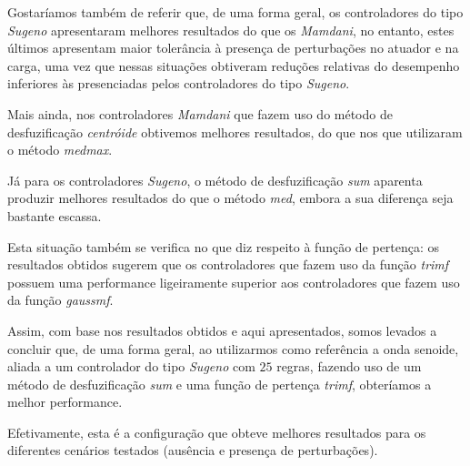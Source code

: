 \documentclass{article}
\begin{document}
Gostaríamos também de referir que, de uma forma geral, os controladores do tipo \emph{Sugeno} apresentaram melhores resultados do que os \emph{Mamdani}, no entanto, estes últimos apresentam maior tolerância à presença de perturbações no atuador e na carga, uma vez que nessas situações obtiveram reduções relativas do desempenho inferiores às presenciadas pelos controladores do tipo \emph{Sugeno}.

Mais ainda, nos controladores \emph{Mamdani} que fazem uso do método de desfuzificação \emph{centróide} obtivemos melhores resultados, do que nos que utilizaram o método \emph{medmax}.

Já para os controladores \emph{Sugeno}, o método de desfuzificação \emph{sum} aparenta produzir melhores resultados do que o método \emph{med}, embora a sua diferença seja bastante escassa.

Esta situação também se verifica no que diz respeito à função de pertença: os resultados obtidos sugerem que os controladores que fazem uso da função \emph{trimf} possuem uma performance ligeiramente superior aos controladores que fazem uso da função \emph{gaussmf}.

Assim, com base nos resultados obtidos e aqui apresentados, somos levados a concluir que, de uma forma geral, ao utilizarmos como referência a onda senoide, aliada a um controlador do tipo \emph{Sugeno} com $25$ regras, fazendo uso de um método de desfuzificação \emph{sum} e uma função de pertença \emph{trimf}, obteríamos a melhor performance.

Efetivamente, esta é a configuração que obteve melhores resultados para os diferentes cenários testados (ausência e presença de perturbações).
\end{document}
